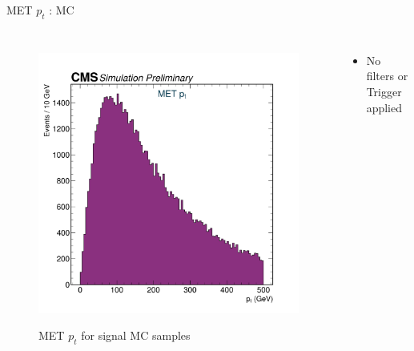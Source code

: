 \documentclass[10pt,xcolor=dvipsnames]{beamer}
\begin{document}
    
   \begin{frame}[fragile]{MET $p_t$ : MC} 
    \begin{columns}
    \begin{figure} 
    \centering 
     \includegraphics[width=1\textwidth]{../Archive/KinemPlots/METMC.png }
    \label{METMC} 
    \caption{MET $p_t$ for signal MC samples}
    \end{figure} 
    \begin{itemize} 
    \raggedright 
    \small
    \item No filters or Trigger applied
    \end{itemize}
    \end{columns} 
    \end{frame} 
    
\end{document}
